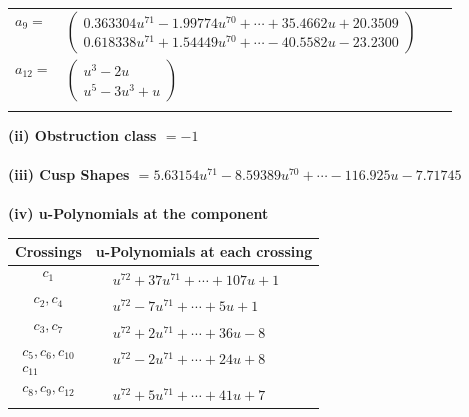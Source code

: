 \documentclass[1p]{elsarticle_modified}
\theoremstyle{definition}
\begin{document}
\begin{tabular}{m{7pt} m{180pt} m{7pt} m{180pt} }
\flushright $a_{9}=$&$\begin{pmatrix}0.363304 u^{71}-1.99774 u^{70}+\cdots+35.4662 u+20.3509\\0.618338 u^{71}+1.54449 u^{70}+\cdots-40.5582 u-23.2300\end{pmatrix}$ \\
\flushright $a_{12}=$&$\begin{pmatrix}u^3-2 u\\u^5-3 u^3+u\end{pmatrix}$\\&\end{tabular}
\flushleft \textbf{(ii) Obstruction class $= -1$}\\~\\
\flushleft \textbf{(iii) Cusp Shapes $= 5.63154 u^{71}-8.59389 u^{70}+\cdots-116.925 u-7.71745$}\\~\\
\newpage\renewcommand{\arraystretch}{1}
\flushleft \textbf{(iv) u-Polynomials at the component}\newline \\
\begin{tabular}{m{50pt}|m{274pt}}
Crossings & \hspace{64pt}u-Polynomials at each crossing \\
\hline $$\begin{aligned}c_{1}\end{aligned}$$&$\begin{aligned}
&u^{72}+37 u^{71}+\cdots+107 u+1
\end{aligned}$\\
\hline $$\begin{aligned}c_{2},c_{4}\end{aligned}$$&$\begin{aligned}
&u^{72}-7 u^{71}+\cdots+5 u+1
\end{aligned}$\\
\hline $$\begin{aligned}c_{3},c_{7}\end{aligned}$$&$\begin{aligned}
&u^{72}+2 u^{71}+\cdots+36 u-8
\end{aligned}$\\
\hline $$\begin{aligned}c_{5},c_{6},c_{10}\\c_{11}\end{aligned}$$&$\begin{aligned}
&u^{72}-2 u^{71}+\cdots+24 u+8
\end{aligned}$\\
\hline $$\begin{aligned}c_{8},c_{9},c_{12}\end{aligned}$$&$\begin{aligned}
&u^{72}+5 u^{71}+\cdots+41 u+7
\end{aligned}$\\
\hline
\end{tabular}\\~\\
\end{document}
